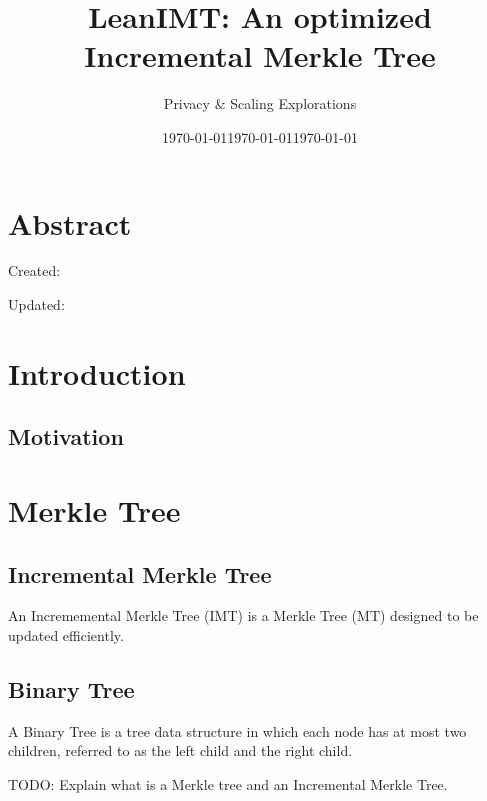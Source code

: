 \documentclass{article}
\title{LeanIMT: An optimized Incremental Merkle Tree}
\author{Privacy \& Scaling Explorations}
\date{\today}
\begin{document}
\maketitle

\section{Abstract}

\newpage
Created: \date{\today}

Updated: \date{\today}

\newpage
\tableofcontents
\newpage

\section{Introduction}

\subsection{Motivation}

\section{Merkle Tree}

\subsection{Incremental Merkle Tree}

An Incrememental Merkle Tree (IMT) is a Merkle Tree (MT) designed to be updated efficiently.

\raggedright



\subsection{Binary Tree}

A Binary Tree is a tree data structure in which each node has at most two children, referred to as the left child and the right child.

TODO: Explain what is a Merkle tree and an Incremental Merkle Tree.

\end{document}
